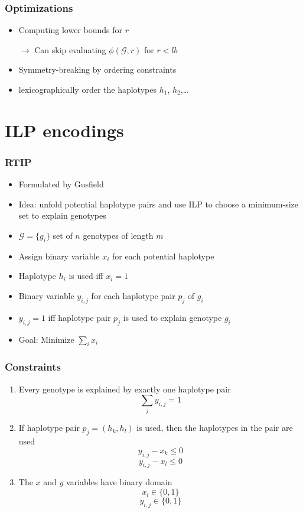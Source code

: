 \documentclass[handout]{beamer}
\begin{document}
\begin{frame}
\frametitle{Optimizations}
\begin{itemize}
\item Computing lower bounds for $r$
\item[$\rightarrow$] Can skip evaluating $\phi (\mathcal{G}, r)$ for $r < lb$
\item Symmetry-breaking by ordering constraints
\item lexicographically order the haplotypes $h_1$, $h_2$,\dots
\end{itemize}
\end{frame}

\section{ILP encodings}

\begin{frame}
\frametitle{RTIP}
\begin{itemize}
\item Formulated by Gusfield~\cite{DBLP:conf/cpm/Gusfield03}
\item Idea: unfold potential haplotype pairs and use ILP to choose a minimum-size set to explain genotypes
\item $\mathcal{G} = \{g_i\}$ set of $n$ genotypes of length $m$
\item Assign binary variable $x_i$ for each potential haplotype
\item Haplotype $h_i$ is used iff $x_i = 1$
\item Binary variable $y_{i,j}$ for each haplotype pair $p_j$ of $g_i$
\item $y_{i,j} = 1$ iff haplotype pair $p_j$ is used to explain genotype $g_i$ 
\item Goal: Minimize $\displaystyle \sum_i x_i$
\end{itemize}
\end{frame}

\begin{frame}
\frametitle{Constraints}
\begin{enumerate}
\item Every genotype is explained by exactly one haplotype pair
$$ \sum_{j} y_{i,j} = 1 $$
\item If haplotype pair $p_j=(h_k, h_l)$ is used, then the haplotypes in the pair are used
$$ y_{i,j} - x_k \leq 0 $$
$$ y_{i,j} - x_l \leq 0 $$
\item The $x$ and $y$ variables have binary domain
$$ x_l\in \{0, 1\} $$
$$ y_{i,j}\in \{0, 1\} $$
\end{enumerate}
\end{frame}
\end{document}
